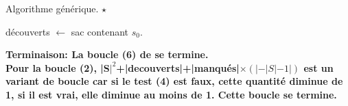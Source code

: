 \documentclass[french, 11pt]{article}
\begin{document}
\begin{defi}{Algorithme générique. $\star$}{}
    \begin{algorithm}[H]
        \LinesNumbered
        \caption{Parcours générique.}
        découverts $\gets$ sac contenant $s_0$.\\
    \end{algorithm}
    \bf{Terminaison:} La boucle (6) de se termine.\\
    Pour la boucle (2), |S$|^2$+|decouverts|+|manqués|$\times(|-|S|-1|)$ est un variant de boucle car si le test (4) est faux, cette quantité diminue de 1, si il est vrai, elle diminue au moins de 1. Cette boucle se termine.
\end{defi}
\end{document}
